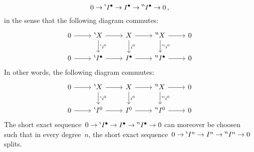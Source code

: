 \begin{lemma}
\begin{enumerate}
      \[
        0
        \to
        {}^{\backprime}I^\bullet
        \to
        I^\bullet
        \to
        {}^{\backprime \backprime}I^\bullet
        \to
        0 \,,
      \]
      in the sense that the following diagram commutes:
      \[
        \begin{tikzcd}
            0
            \arrow{r}
          & \bp X
            \arrow{r}
            \arrow{d}[right]{\bp i^0}
          & X
            \arrow{r}
            \arrow{d}[right]{i^0}
          & \bpp X
            \arrow{r}
            \arrow{d}[right]{\bpp i^0}
          & 0
          \\
            0
            \arrow{r}
          & \bp\Iccc
            \arrow{r}
          & \Iccc
            \arrow{r}
          & \bpp\Iccc
            \arrow{r}
          & 0
        \end{tikzcd}
      \]
      In other words, the following diagram commutes:
      \[
        \begin{tikzcd}
            0
            \arrow{r}
          & \bp X
            \arrow{r}
            \arrow{d}[right]{\bp i^0}
          & X
            \arrow{r}
            \arrow{d}[right]{i^0}
          & \bpp X
            \arrow{r}
            \arrow{d}[right]{\bpp i^0}
          & 0
          \\
            0
            \arrow{r}
          & \bp I^0
            \arrow{r}
          & I^0
            \arrow{r}
          & \bpp I^0
            \arrow{r}
          & 0
        \end{tikzcd}
      \]
      The short exact sequence~$0 \to {}^{\backprime}I^\bullet \to I^\bullet \to {}^{\backprime \backprime}I^\bullet \to 0$ can moreover be choosen such that in every degree~$n$, the short exact sequence~$0 \to {}^{\backprime} I^n \to I^n \to {}^{\backprime \backprime} I^n \to 0$ splits.
  \end{enumerate}
\end{lemma}


